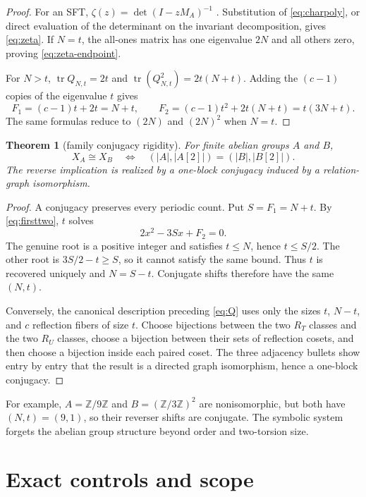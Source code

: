 \documentclass[11pt,a4paper]{amsart}
\newtheorem{theorem}{Theorem}[section]
\theoremstyle{definition}
\theoremstyle{remark}
\newcommand{\tr}{\operatorname{tr}}
\newcommand{\Z}{\mathbb Z}
\begin{document}
\begin{proof}
For an SFT, $\zeta(z)=\det(I-zM_A)^{-1}$
\cite{LindMarcus1995}.  Substitution of \eqref{eq:charpoly}, or direct
evaluation of the determinant on the invariant decomposition, gives
\eqref{eq:zeta}.  If $N=t$, the all-ones matrix has one eigenvalue $2N$ and
all others zero, proving \eqref{eq:zeta-endpoint}.

For $N>t$, $\tr Q_{N,t}=2t$ and
$\tr(Q_{N,t}^2)=2t(N+t)$.  Adding the $(c-1)$ copies of the eigenvalue $t$
gives
\[
 F_1=(c-1)t+2t=N+t,
 \qquad
 F_2=(c-1)t^2+2t(N+t)=t(3N+t).
\]
The same formulas reduce to $(2N)$ and $(2N)^2$ when $N=t$.
\end{proof}

\begin{theorem}[family conjugacy rigidity]\label{thm:rigidity}
For finite abelian groups $A$ and $B$,
\[
 X_A\cong X_B
 \quad\Longleftrightarrow\quad
 (|A|,|A[2]|)=(|B|,|B[2]|).
\]
The reverse implication is realized by a one-block conjugacy induced by a
relation-graph isomorphism.
\end{theorem}

\begin{proof}
A conjugacy preserves every periodic count.  Put $S=F_1=N+t$.  By
\eqref{eq:firsttwo}, $t$ solves
\begin{equation}\label{eq:quadratic}
 2x^2-3Sx+F_2=0.
\end{equation}
The genuine root is a positive integer and satisfies $t\leq N$, hence
$t\leq S/2$.  The other root is $3S/2-t\geq S$, so it cannot satisfy the
same bound.  Thus $t$ is recovered uniquely and $N=S-t$.  Conjugate shifts
therefore have the same $(N,t)$.

Conversely, the canonical description preceding \eqref{eq:Q} uses only the
sizes $t$, $N-t$, and $c$ reflection fibers of size $t$.  Choose bijections
between the two $R_T$ classes and the two $R_U$ classes, choose a bijection
between their sets of reflection cosets, and then choose a bijection inside
each paired coset.  The three adjacency bullets show entry by entry that the
result is a directed graph isomorphism, hence a one-block conjugacy.
\end{proof}

For example, $A=\Z/9\Z$ and $B=(\Z/3\Z)^2$ are nonisomorphic, but both have
$(N,t)=(9,1)$, so their reverser shifts are conjugate.  The symbolic system
forgets the abelian group structure beyond order and two-torsion size.

\section{Exact controls and scope}
\end{document}
